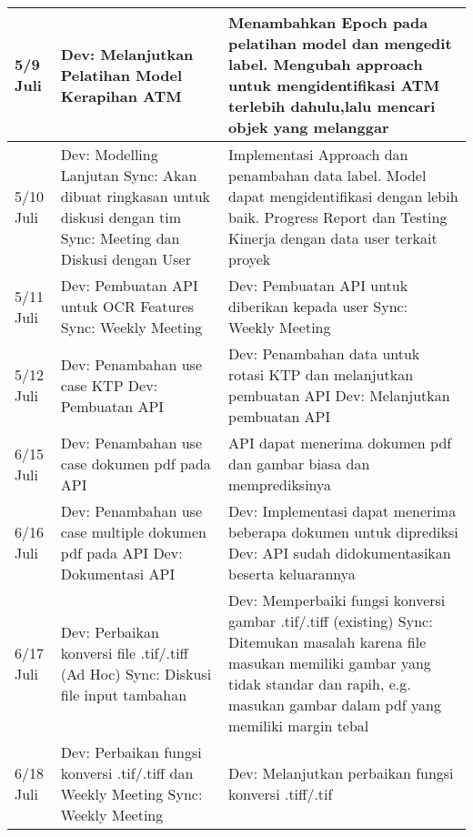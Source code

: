 \begin{longtable}{|p{5em}|p{10em}|p{15em}|}
        5/9 Juli & Dev: Melanjutkan Pelatihan Model Kerapihan ATM & Menambahkan Epoch pada pelatihan model dan mengedit label. Mengubah approach untuk mengidentifikasi ATM terlebih dahulu,lalu mencari objek yang melanggar \\ \hline
        5/10 Juli & Dev: Modelling Lanjutan \newline 
Sync: Akan dibuat ringkasan untuk diskusi dengan tim \newline 
Sync: Meeting dan Diskusi dengan User & Implementasi Approach dan penambahan data label. Model dapat mengidentifikasi dengan lebih baik. \newline 
Progress Report dan Testing Kinerja dengan data user terkait proyek \\ \hline
        5/11 Juli & Dev: Pembuatan API untuk OCR Features \newline 
Sync: Weekly Meeting & Dev: Pembuatan API untuk diberikan kepada user \newline 
Sync: Weekly Meeting \\ \hline
        5/12 Juli & Dev: Penambahan use case KTP \newline 
Dev: Pembuatan API & Dev: Penambahan data untuk rotasi KTP dan melanjutkan pembuatan API \newline 
Dev: Melanjutkan pembuatan API \\ \hline
        6/15 Juli & Dev: Penambahan use case dokumen pdf pada API & API dapat menerima dokumen pdf dan gambar biasa dan memprediksinya \\ \hline
        6/16 Juli & Dev: Penambahan use case multiple dokumen pdf pada API \newline 
Dev: Dokumentasi API & Dev: Implementasi dapat menerima beberapa dokumen untuk diprediksi \newline 
Dev: API sudah didokumentasikan beserta keluarannya \\ \hline
        6/17 Juli & Dev: Perbaikan konversi file .tif/.tiff (Ad Hoc) \newline 
Sync: Diskusi file input tambahan & Dev: Memperbaiki fungsi konversi gambar .tif/.tiff (existing) \newline 
Sync: Ditemukan masalah karena file masukan memiliki gambar yang tidak standar dan rapih, e.g. masukan gambar dalam pdf yang memiliki margin tebal \\ \hline
        6/18 Juli & Dev: Perbaikan fungsi konversi .tif/.tiff dan Weekly Meeting \newline 
Sync: Weekly Meeting & Dev: Melanjutkan perbaikan fungsi konversi .tiff/.tif \newline 

\end{longtable}

